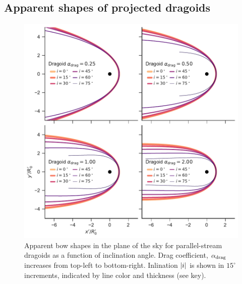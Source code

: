 


\subsection{Apparent shapes of projected dragoids}
\label{sec:dust-wave-apparent}

\begin{figure}
  \centering
  \includegraphics[width=\linewidth]{figs/test_xyprime_dragoid}
  \caption{Apparent bow shapes in the plane of the sky for
    parallel-stream dragoids as a function of inclination angle.  Drag
    coefficient, \(\alpha_{\text{drag}}\) increases from top-left to bottom-right.
    Inlination \(\lvert i\rvert\) is shown in \(15^\circ\) increments, indicated
    by line color and thickness (see key).}
  \label{fig:dragoid-xy-prime}
\end{figure}
